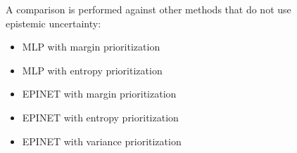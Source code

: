 \documentclass[preview]{standalone}
\begin{document}
\begin{center}
A comparison is performed against other methods that do not use \\
            epistemic uncertainty:
            \begin{itemize}
            \item MLP with margin prioritization
            \item MLP with entropy prioritization
            \item EPINET with margin prioritization
            \item EPINET with entropy prioritization
            \item EPINET with variance prioritization
            \end{itemize}
\end{center}
\end{document}
